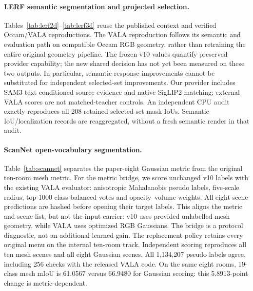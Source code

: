 \paragraph{LERF semantic segmentation and projected selection.}
Tables~\ref{tab:lerf2d}--\ref{tab:lerf3d} reuse the published context and verified
Occam/VALA reproductions. The VALA reproduction follows its semantic and
evaluation path on compatible Occam RGB geometry, rather than retraining the
entire original geometry pipeline. The frozen v10 values quantify preserved
provider capability; the new shared decision has not yet been measured on these
two outputs. In particular, semantic-response improvements cannot be substituted
for independent selected-set improvements.
Our provider includes SAM3 text-conditioned source evidence and native SigLIP2
matching; external VALA scores are not matched-teacher controls. An independent
CPU audit exactly reproduces all 208 retained selected-set mask IoUs. Semantic
IoU/localization records are reaggregated, without a fresh semantic render in
that audit.

\begin{table}[ht]
\centering\small
\caption{LERF-2D. P values are reported in VALA Table 1~\cite{vala}.
Localization is peak-in-box accuracy, not ranking AP. B uses source-assisted
full teachers; it is not a gain of the proposed replacement decision.}
\label{tab:lerf2d}
\end{table}
\begin{table}[ht]
\centering\small
\caption{LERF selected-Gaussian projection. P values are reported in VALA
Table 1~\cite{vala}; Acc.@0.25 counts projected masks with IoU above 0.25.
VALA's published value is 58.02/82.85; 43.29/64.30 belongs to Dr. Splat.
The local VALA R row uses compatible RGB geometry.}
\label{tab:lerf3d}
\end{table}

\paragraph{ScanNet open-vocabulary segmentation.}
Table~\ref{tab:scannet} separates the paper-eight Gaussian metric from the
original ten-room mesh metric. For the metric bridge, we score unchanged v10
labels with the existing VALA evaluator: anisotropic Mahalanobis pseudo labels,
five-scale radius, top-1000 class-balanced votes and opacity--volume weights.
All eight scene predictions are hashed before opening their target labels.
This aligns the metric and scene list, but not the input carrier: v10 uses
provided unlabelled mesh geometry, while VALA uses optimized RGB Gaussians.
The bridge is a protocol diagnostic, not an additional learned gain. The
replacement policy retains every original menu on the internal ten-room track.
Independent scoring reproduces all ten mesh scenes and all eight Gaussian
scenes. All 1,134,207 pseudo labels agree, including 256 checks with the released
VALA code. On the same eight rooms, 19-class mesh mIoU is 61.0567 versus
66.9480 for Gaussian scoring: this 5.8913-point change is metric-dependent.

